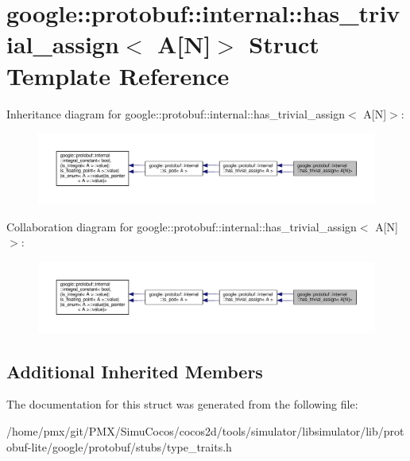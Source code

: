 \hypertarget{structgoogle_1_1protobuf_1_1internal_1_1has__trivial__assign_3_01A[N]_4}{}\section{google\+:\+:protobuf\+:\+:internal\+:\+:has\+\_\+trivial\+\_\+assign$<$ A\mbox{[}N\mbox{]}$>$ Struct Template Reference}
\label{structgoogle_1_1protobuf_1_1internal_1_1has__trivial__assign_3_01A[N]_4}


Inheritance diagram for google\+:\+:protobuf\+:\+:internal\+:\+:has\+\_\+trivial\+\_\+assign$<$ A\mbox{[}N\mbox{]}$>$\+:
\nopagebreak
\begin{figure}[H]
\begin{center}
\leavevmode
\includegraphics[width=350pt]{structgoogle_1_1protobuf_1_1internal_1_1has__trivial__assign_3_01A[N]_4__inherit__graph}
\end{center}
\end{figure}


Collaboration diagram for google\+:\+:protobuf\+:\+:internal\+:\+:has\+\_\+trivial\+\_\+assign$<$ A\mbox{[}N\mbox{]}$>$\+:
\nopagebreak
\begin{figure}[H]
\begin{center}
\leavevmode
\includegraphics[width=350pt]{structgoogle_1_1protobuf_1_1internal_1_1has__trivial__assign_3_01A[N]_4__coll__graph}
\end{center}
\end{figure}
\subsection*{Additional Inherited Members}


The documentation for this struct was generated from the following file\+:\begin{DoxyCompactItemize}
\item 
/home/pmx/git/\+P\+M\+X/\+Simu\+Cocos/cocos2d/tools/simulator/libsimulator/lib/protobuf-\/lite/google/protobuf/stubs/type\+\_\+traits.\+h\end{DoxyCompactItemize}
